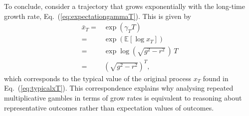 \documentclass[11pt]{article}
\begin{document}
\begin{multicols}{2}
To conclude, consider a trajectory that grows exponentially with the long-time growth rate, Eq.~(\ref{eq:expectationgammaT}). This is given by
\begin{align*}
\bar{x}_T =& \exp \left( \gamma_T T\right)\\
=& \exp \left(\mathbb{E} \left[ \log x_T \right]\right)\\
=& \exp \log \left( \sqrt{g^2 - r^2}\,\right)\,T\\
=& \left( \sqrt{g^2 - r^2}\right)^T,
\end{align*}
which corresponds to the typical value of the original process $x_T$ found in Eq.~(\ref{eq:typicalxT}). This correspondence explains why analysing repeated multiplicative gambles in terms of grow rates is equivalent to reasoning about representative outcomes rather than expectation values of outcomes.

%
%


\end{multicols}
\end{document}
